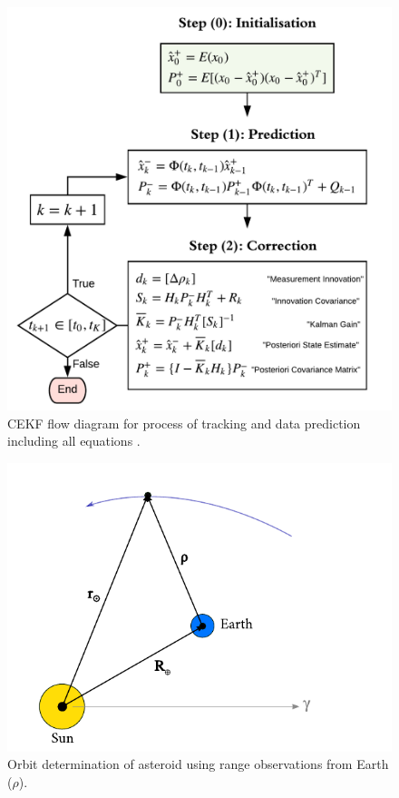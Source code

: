 \begin{figure}[htp]
    \centering
    \includegraphics[width=0.55\linewidth]{graphics/CEKF.png}
    \caption{CEKF flow diagram for process of tracking and data prediction including all equations \cite{3}.}
    \label{fig:CEKF}
\end{figure}


\begin{figure}[htp]
    \centering
    \includegraphics[width=0.5\linewidth]{graphics/pod-1.pdf}
    \caption{Orbit determination of asteroid using range observations from Earth ($\rho$).}
    \label{fig:my_label}
\end{figure}
